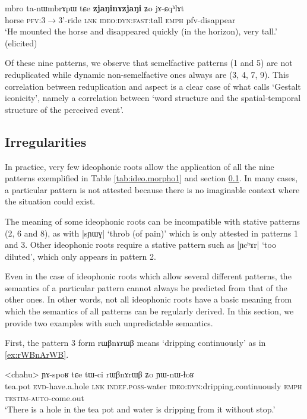 \documentclass[oldfontcommands,oneside,a4paper,11pt]{article}
\newcommand{\ipa}[1]{{\phon \mbox{#1}}} %
\begin{document}
    \begin{exe} 
\ex  \label{ex:ideo9}
\gll 
\ipa{mbro}  	\ipa{ta-nɯmbrɤpɯ}  	\ipa{tɕe}  	\ipa{\textbf{zjaŋinɤzjaŋi}}  	\ipa{ʑo}  	\ipa{jɤ-ɕqʰlɤt}  \\
horse \textsc{pfv}:3$\rightarrow$3'-ride \textsc{lnk} \textsc{ideo:dyn:fast}:tall \textsc{emph} pfv-disappear \\
\glt `He mounted the horse and disappeared quickly (in the horizon), very tall.'  (elicited)
   \end{exe}


Of these nine patterns, we observe that semelfactive  patterns (1 and 5) are not reduplicated while dynamic non-semelfactive ones always are (3, 4, 7, 9). This correlation between reduplication and aspect is a clear case of what \citet[47]{dingemanse11ezra} calls `Gestalt iconicity', namely a correlation between `word structure and the spatial-temporal structure of the perceived event'. 
 

\subsection{Irregularities} \label{sec:ideo.irregular}
In practice, very few ideophonic roots allow the application of all the nine patterns exemplified in Table \ref{tab:ideo.morpho1}  and section \ref{sec:ideo.irregular}.  In many cases, a particular pattern is not attested because there is no imaginable context where the situation could exist.

The meaning of some ideophonic roots can be incompatible with stative patterns (2, 6 and 8), as with |\ipa{sɲɯɣ}| `throb (of pain)' which is only attested in patterns 1 and 3. Other ideophonic roots require a stative pattern such as |\ipa{ɲcʰɤr}| `too diluted', which only appears in pattern 2.

Even in the case of ideophonic roots which allow several different patterns, the semantics of a particular pattern cannot always be predicted from that of the other ones. In other words, not all ideophonic roots have a basic meaning from which the semantics of all patterns can be regularly derived. In this section, we provide two examples with such unpredictable semantics.

First, the pattern 3 form \ipa{rɯβnɤrɯβ} means `dripping continuously' as in \ref{ex:rWBnArWB}.
  \begin{exe} 
\ex  \label{ex:rWBnArWB}
\gll 
<chahu>  \ipa{ɲɤ-spoʁ}  	\ipa{tɕe}  	\ipa{tɯ-ci}  	\ipa{rɯβnɤrɯβ}  	\ipa{ʑo}  	\ipa{ɲɯ-nɯ-ɬoʁ}   \\
tea.pot \textsc{evd}-have.a.hole \textsc{lnk} \textsc{indef.poss}-water \textsc{ideo:dyn}:dripping.continuously \textsc{emph} \textsc{testim-auto}-come.out  \\
\glt `There is a hole in the tea pot and water  is dripping from it without stop.'
  \end{exe}
\end{document}

